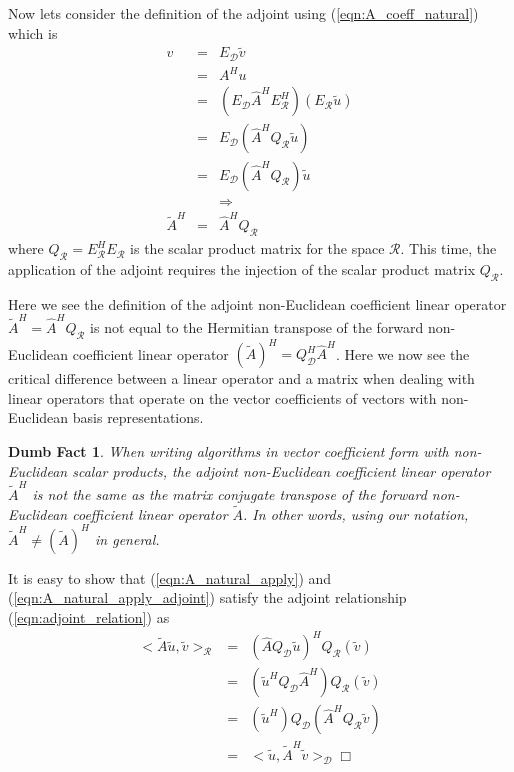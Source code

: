 \documentclass[pdf,ps2pdf,11pt]{SANDreport}
\newtheorem{dumb_fact}{Dumb Fact}[section]
\begin{document}
Now lets consider the definition of the adjoint using (\ref{eqn:A_coeff_natural}) which is
%
\begin{eqnarray}
v
& = & E_{\mathcal{D}} \tilde{v} \nonumber \\
& = & A^H u \nonumber \\
& = & ( E_{\mathcal{D}} \hat{A}^H E_{\mathcal{R}}^H ) ( E_{\mathcal{R}} \tilde{u} ) \nonumber \\
& = & E_{\mathcal{D}} ( \hat{A}^H Q_{\mathcal{R}} \tilde{u} ) \nonumber \\
& = & E_{\mathcal{D}} ( \hat{A}^H Q_{\mathcal{R}} ) \tilde{u} \nonumber \\
&  & \Rightarrow \nonumber \\
\tilde{A}^H & = & \hat{A}^H Q_{\mathcal{R}}
\label{eqn:A_natural_apply_adjoint}
\end{eqnarray}
%
where $Q_{\mathcal{R}} = E_{\mathcal{R}}^H E_{\mathcal{R}}$ is the scalar
product matrix for the space $\mathcal{R}$.  This time, the application of the
adjoint requires the injection of the scalar product matrix
$Q_{\mathcal{R}}$.

Here we see the definition of the adjoint non-Euclidean coefficient linear
operator $\tilde{A}^H=\hat{A}^H Q_{\mathcal{R}}$ is not equal to the Hermitian
transpose of the forward non-Euclidean coefficient linear operator
$(\tilde{A})^H = Q_{\mathcal{D}}^H {}\hat{A}^H$.  Here we now see the critical
difference between a linear operator and a matrix when dealing with linear
operators that operate on the vector coefficients of vectors with
non-Euclidean basis representations.

\begin{dumb_fact}
When writing algorithms in vector coefficient form with non-Euclidean scalar
products, the adjoint non-Euclidean coefficient linear operator $\tilde{A}^H$
is not the same as the matrix conjugate transpose of the forward non-Euclidean
coefficient linear operator $\tilde{A}$.  In other words, using our notation,
$\tilde{A}^H {}\ne (\tilde{A})^H$ in general.
\end{dumb_fact}

It is easy to show that (\ref{eqn:A_natural_apply}) and
(\ref{eqn:A_natural_apply_adjoint}) satisfy the adjoint relationship
(\ref{eqn:adjoint_relation}) as
%
\begin{eqnarray}
<\tilde{A} \tilde{u}, \tilde{v}>_{\mathcal{R}}
& = & (\hat{A} Q_{\mathcal{D}} \tilde{u} )^H Q_{\mathcal{R}} (\tilde{v}) \nonumber \\
& = & ( \tilde{u}^H Q_{\mathcal{D}} \hat{A}^H ) Q_{\mathcal{R}} (\tilde{v}) \nonumber \\
& = & (\tilde{u}^H ) Q_{\mathcal{D}} ( \hat{A}^H Q_{\mathcal{R}} \tilde{v}) \nonumber \\
& = & <\tilde{u}, \tilde{A}^H \tilde{v}>_{\mathcal{D}} \Box
\label{eqn:adjoint_relation_proved}
\end{eqnarray}
%
\end{document}
